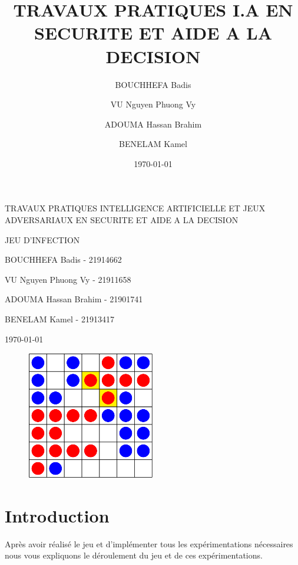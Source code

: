 \documentclass[11pt, pdflatex]{report}
\title{TRAVAUX PRATIQUES I.A EN SECURITE ET AIDE A LA DECISION}
\author{BOUCHHEFA Badis\and VU Nguyen Phuong Vy\and ADOUMA Hassan Brahim\and BENELAM Kamel}
\date{\today}
\begin{document}
\begin{titlepage}
    \vspace*{1em}
    \centering
    {\LARGE TRAVAUX PRATIQUES INTELLIGENCE ARTIFICIELLE ET JEUX ADVERSARIAUX EN SECURITE ET AIDE A LA DECISION\par}
    \vspace{1cm}
    {\scshape\Large JEU D'INFECTION\par}
    \vspace{1cm}
	{\Large BOUCHHEFA Badis - 21914662 \par}
	{\Large VU Nguyen Phuong Vy - 21911658\par}
	{\Large ADOUMA Hassan Brahim - 21901741\par}
	{\Large BENELAM Kamel - 21913417\par}
    \vspace{1cm}
	{\large \today \par}
    \vspace{1cm}

    \begin{figure}[H]
        \centering
        \includegraphics[width=0.5\textwidth]{capture.png}
    \end{figure}
    
\end{titlepage}

\pagebreak

\tableofcontents

\pagebreak
\section{Introduction}
Après avoir réalisé le jeu et d’implémenter tous les expérimentations nécessaires nous vous expliquons le déroulement du jeu et de ces expérimentations.
\end{document}
